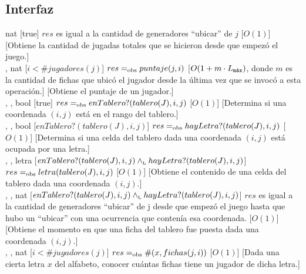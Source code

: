 \begin{interfaz}{\subsection{Interfaz}}
\begin{operaciones}
    \noindent{}
    {}{nat}
    [true]
    {$res$ es igual a la cantidad de generadores ``ubicar'' de $j$}
    [$O(1)$]
    [Obtiene la cantidad de jugadas totales que se hicieron desde que empezó el juego.]\\

    \noindent{}
    {, }{nat}
    [$i < \#jugadores(j)$]
    {$res\igobs puntaje(j,i)$}
    [$O(1+m\cdot \Lmax)$, donde $m$ es la cantidad de fichas que ubicó el
jugador desde la última vez que se invocó a esta operación.]
    [Obtiene el puntaje de un jugador.]\\

    \noindent{}
    {, , }{bool}
    [true]
    {$res\igobs enTablero?(tablero(J),i,j)$}
    [$O(1)$]
    [Determina si una coordenada $(i,j)$ está en el rango del tablero.]\\

    \noindent{}
    {, , }{bool}
    [$enTablero?(tablero(J),i,j)$]
    {$res\igobs hayLetra?(tablero(J),i,j)$}
    [$O(1)$]
    [Determina si una celda del tablero dada una coordenada $(i,j)$ está ocupada por una letra.]\\

    \noindent{}
    {, , }{letra}
    [$enTablero?(tablero(J),i,j)\yluego hayLetra?(tablero(J),i,j)$]
    {$res\igobs letra(tablero(J),i,j)$}
    [$O(1)$]
    [Obtiene el contenido de una celda del tablero dada una coordenada $(i,j)$.]\\

    \noindent{}
    {, , }{nat}
    [$enTablero?(tablero(J),i,j)\yluego hayLetra?(tablero(J),i,j)$]
    {$res$ es igual a la cantidad de generadores ``ubicar'' de j desde que empezó el juego hasta que hubo un ``ubicar'' con una ocurrencia que contenía esa coordenada.}
    [$O(1)$]
    [Obtiene el momento en que una ficha del tablero fue puesta dada una coordenada $(i,j)$.]\\

    \noindent{}
    {, , }{nat}
    [$i < \#jugadores(j)$]
    {$res\igobs \#(x,fichas(j,i))$}
    [$O(1)$]
    [Dada una cierta letra $x$ del alfabeto, conocer cuántas fichas tiene un jugador de dicha letra.]\\

  \end{operaciones}
\end{interfaz}

